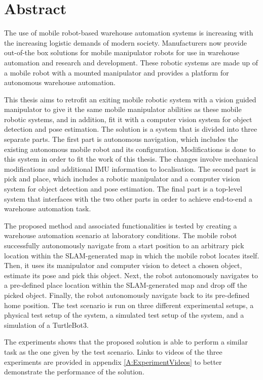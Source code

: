 \chapter*{Abstract}


The use of mobile robot-based warehouse automation systems is increasing with the increasing logistic demands of modern society. Manufacturers now provide out-of-the box solutions for mobile manipulator robots for use in warehouse automation and research and development. These robotic systems are made up of a mobile robot with a mounted manipulator and provides a platform for autonomous warehouse automation.

This thesis aims to retrofit an exiting mobile robotic system with a vision guided manipulator to give it the same mobile manipulator abilities as these mobile robotic systems, and in addition, fit it with a computer vision system for object detection and pose estimation. The solution is a system that is  divided into three separate parts. The first part is autonomous navigation, which includes the existing autonomous mobile robot and its configuration. Modifications is done to this system in order to fit the work of this thesis. The changes involve mechanical modifications and additional IMU information to localisation. The second part is pick and place, which includes a robotic manipulator and a computer vision system for object detection and pose estimation. The final part is a top-level system that interfaces with the two other parts in order to achieve end-to-end a warehouse automation task.

The proposed method and associated functionalities is tested by creating a warehouse automation scenario at laboratory conditions. The mobile robot successfully autonomously navigate from a start position to an arbitrary pick location within the SLAM-generated map in which the mobile robot locates itself. Then, it uses its manipulator and computer vision to detect a chosen object, estimate its pose and pick this object. Next, the robot autonomously navigates to a pre-defined place location within the SLAM-generated map and drop off the picked object. Finally, the robot autonomously navigate back to its pre-defined home position. The test scenario is run on three different experimental setups, a physical test setup of the system, a simulated test setup of the system, and a simulation of a TurtleBot3.

The experiments shows that the proposed solution is able to perform a similar task as the one given by the test scenario. Links to videos of the three experiments are provided in appendix \ref{A:ExperimentVideos} to better demonstrate the performance of the solution.

